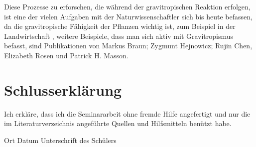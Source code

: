 \documentclass[
a4paper, 
11pt, 
ngerman,
listof=totoc,
bibliography=totocnumbered,
abstracton
]{scrreprt}
\begin{document}
Diese Prozesse zu erforschen, die während der gravitropischen Reaktion erfolgen, ist eine der vielen Aufgaben mit der Naturwissenschaftler sich bis heute befassen, da die gravitropische Fähigkeit der Pflanzen wichtig ist, zum Beispiel in der Landwirtschaft \parencite[343]{Chen1999}, weitere Beispiele, dass man sich aktiv mit Gravitropismus befasst, sind Publikationen von Markus Braun; Zygmunt Hejnowicz; Rujin Chen, Elizabeth Rosen und Patrick H. Masson.


\printbibliography

\chapter {Schlusserklärung}

Ich erkläre, dass ich die Seminararbeit ohne fremde Hilfe angefertigt und nur die im Literaturverzeichnis angeführte Quellen und Hilfsmitteln benützt habe.


Ort Datum Unterschrift des Schülers 
\end{document}
